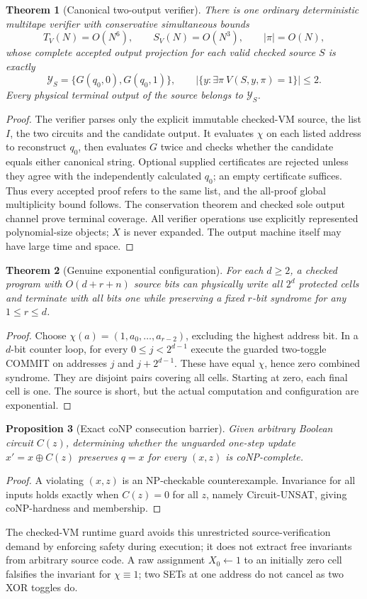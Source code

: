 \documentclass[11pt]{article}
\newtheorem{theorem}{Theorem}
\newtheorem{proposition}[theorem]{Proposition}
\begin{document}
\begin{theorem}[Canonical two-output verifier]
There is one ordinary deterministic multitape verifier with conservative simultaneous bounds
\[
T_V(N)=O(N^6),\qquad S_V(N)=O(N^3),\qquad |\pi|=O(N),
\]
whose complete accepted output projection for each valid checked source $S$ is exactly
\[
\mathcal Y_S=\{G(q_0,0),G(q_0,1)\},\qquad
|\{y:\exists\pi\ V(S,y,\pi)=1\}|\le2.
\]
Every physical terminal output of the source belongs to $\mathcal Y_S$.
\end{theorem}
\begin{proof}
The verifier parses only the explicit immutable checked-VM source, the list $I$, the two circuits and the candidate output. It evaluates $\chi$ on each listed address to reconstruct $q_0$, then evaluates $G$ twice and checks whether the candidate equals either canonical string. Optional supplied certificates are rejected unless they agree with the independently calculated $q_0$; an empty certificate suffices. Thus every accepted proof refers to the same list, and the all-proof global multiplicity bound follows. The conservation theorem and checked sole output channel prove terminal coverage. All verifier operations use explicitly represented polynomial-size objects; $X$ is never expanded. The output machine itself may have large time and space.
\end{proof}

\begin{theorem}[Genuine exponential configuration]
For each $d\ge2$, a checked program with $O(d+r+n)$ source bits can physically write all $2^d$ protected cells and terminate with all bits one while preserving a fixed $r$-bit syndrome for any $1\le r\le d$.
\end{theorem}
\begin{proof}
Choose $\chi(a)=(1,a_0,\ldots,a_{r-2})$, excluding the highest address bit. In a $d$-bit counter loop, for every $0\le j<2^{d-1}$ execute the guarded two-toggle COMMIT on addresses $j$ and $j+2^{d-1}$. These have equal $\chi$, hence zero combined syndrome. They are disjoint pairs covering all cells. Starting at zero, each final cell is one. The source is short, but the actual computation and configuration are exponential.
\end{proof}

\begin{proposition}[Exact coNP consecution barrier]
Given arbitrary Boolean circuit $C(z)$, determining whether the unguarded one-step update $x'=x\oplus C(z)$ preserves $q=x$ for every $(x,z)$ is coNP-complete.
\end{proposition}
\begin{proof}
A violating $(x,z)$ is an NP-checkable counterexample. Invariance for all inputs holds exactly when $C(z)=0$ for all $z$, namely Circuit-UNSAT, giving coNP-hardness and membership.
\end{proof}
The checked-VM runtime guard avoids this unrestricted source-verification demand by enforcing safety during execution; it does not extract free invariants from arbitrary source code. A raw assignment $X_0\leftarrow1$ to an initially zero cell falsifies the invariant for $\chi\equiv1$; two SETs at one address do not cancel as two XOR toggles do.
\end{document}
